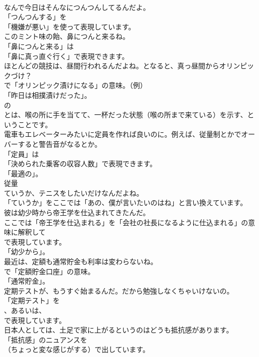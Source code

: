 \documentclass[8pt]{extreport}
\begin{document}
\begin{CJK}{UTF8}{min}
\\	なんで今日はそんなにつんつんしてるんだよ。 
\\	「つんつんする」を
\\	「機嫌が悪い」を使って表現しています。	
\\	このミント味の飴、鼻につんと来るね。 
\\	「鼻につんと来る」は
\\	「鼻に真っ直ぐ行く」で表現できます。	
\\	ほとんどの競技は、昼間行われるんだよね。となると、真っ昼間からオリンピックづけ？ 
\\	で「オリンピック漬けになる」の意味。（例）
\\	「昨日は相撲漬けだった」。
\\	の
\\	とは、喉の所に手を当てて、一杯だった状態（喉の所まで来ている）を示す、ということです。	
\\	電車もエレベーターみたいに定員を作れば良いのに。例えば、従量制とかでオーバーすると警告音がなるとか。 
\\	「定員」は
\\	「決められた乗客の収容人数」で表現できます。
\\	「最適の」。	
\\	従量
\\	ていうか、テニスをしたいだけなんだよね。 
\\	「ていうか」をここでは「あの、僕が言いたいのはね」と言い換えています。	
\\	彼は幼少時から帝王学を仕込まれてきたんだ。 
\\	ここでは「帝王学を仕込まれる」を「会社の社長になるように仕込まれる」の意味に解釈して
\\	で表現しています。
\\	「幼少から」。	
\\	最近は、定額も通常貯金も利率は変わらないね。 
\\	で「定額貯金口座」の意味。
\\	「通常貯金」。	
\\	定期テストが、もうすぐ始まるんだ。だから勉強しなくちゃいけないの。 
\\	「定期テスト」を 
\\	、あるいは、
\\	で表現しています。	
\\	日本人としては、土足で家に上がるというのはどうも抵抗感があります。 
\\	「抵抗感」のニュアンスを
\\	（ちょっと変な感じがする）で出しています。	

\end{CJK}
\end{document}
